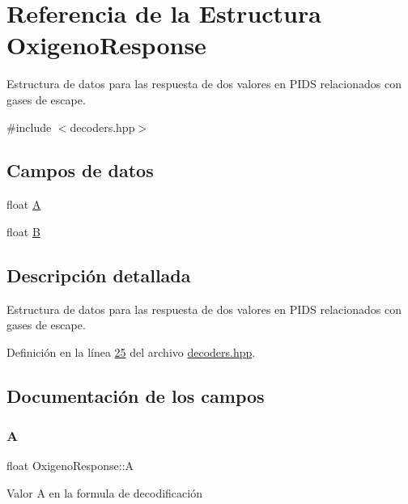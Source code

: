 \hypertarget{structOxigenoResponse}{}\section{Referencia de la Estructura Oxigeno\+Response}
\label{structOxigenoResponse}


Estructura de datos para las respuesta de dos valores en P\+I\+DS relacionados con gases de escape.  




{\ttfamily \#include $<$decoders.\+hpp$>$}

\subsection*{Campos de datos}
\begin{DoxyCompactItemize}
\item 
float \hyperlink{structOxigenoResponse_a068c403e5746226cf22bb020b4c786d3}{A}
\item 
float \hyperlink{structOxigenoResponse_a96b19152dd001e19d1351e2d97f22736}{B}
\end{DoxyCompactItemize}


\subsection{Descripción detallada}
Estructura de datos para las respuesta de dos valores en P\+I\+DS relacionados con gases de escape. 

Definición en la línea \hyperlink{decoders_8hpp_source_l00025}{25} del archivo \hyperlink{decoders_8hpp_source}{decoders.\+hpp}.



\subsection{Documentación de los campos}
\mbox{\label{structOxigenoResponse_a068c403e5746226cf22bb020b4c786d3}} 
\subsubsection{\texorpdfstring{A}{A}}
{\footnotesize\ttfamily float Oxigeno\+Response\+::A}

Valor A en la formula de decodificación 

